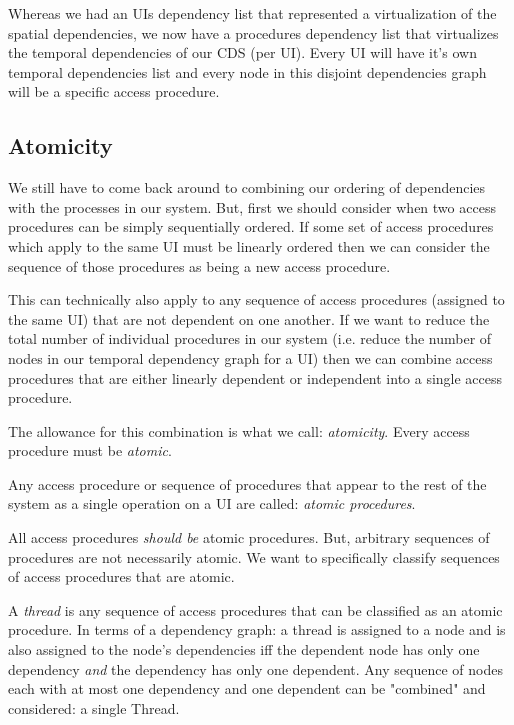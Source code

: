 Whereas we had an UIs dependency list that represented a virtualization of the spatial dependencies, we now have a procedures dependency list that virtualizes the temporal dependencies of our CDS (per UI). Every UI will have it's own temporal dependencies list and every node in this disjoint dependencies graph will be a specific access procedure.

\subsection{Atomicity}

We still have to come back around to combining our ordering of dependencies with the processes in our system. But, first we should consider when two access procedures can be simply sequentially ordered. If some set of access procedures which apply to the same UI must be linearly ordered then we can consider the sequence of those procedures as being a new access procedure.

This can technically also apply to any sequence of access procedures (assigned to the same UI) that are not dependent on one another. If we want to reduce the total number of individual procedures in our system (i.e. reduce the number of nodes in our temporal dependency graph for a UI) then we can combine access procedures that are either linearly dependent or independent into a single access procedure.

The allowance for this combination is what we call: \textit{atomicity}. Every access procedure must be \textit{atomic}.

\begin{con-def}
	\label{atomic-procedures}
	Any access procedure or sequence of procedures that appear to the rest of the system as a single operation on a UI are called: \textit{atomic procedures}.
\end{con-def}

All access procedures \textit{should be} atomic procedures. But, arbitrary sequences of procedures are not necessarily atomic. We want to specifically classify sequences of access procedures that are atomic.

\begin{con-def}[Thread]
	\label{thread}
	A \textit{thread} is any sequence of access procedures that can be classified as an atomic procedure. In terms of a dependency graph: a thread is assigned to a node and is also assigned to the node's dependencies iff the dependent node has only one dependency \textit{and} the dependency has only one dependent. Any sequence of nodes each with at most one dependency and one dependent can be "combined" and considered: a single Thread.
\end{con-def}

